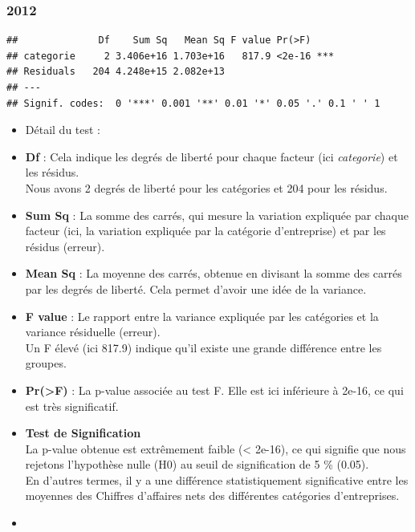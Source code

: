 \documentclass[mstat,12pt]{unswthesis}
\begin{document}
\medskip

\subsubsection{\texorpdfstring{\textbf{2012}}{2012}}\label{section}

\medskip

\begin{verbatim}
##              Df    Sum Sq   Mean Sq F value Pr(>F)    
## categorie     2 3.406e+16 1.703e+16   817.9 <2e-16 ***
## Residuals   204 4.248e+15 2.082e+13                   
## ---
## Signif. codes:  0 '***' 0.001 '**' 0.01 '*' 0.05 '.' 0.1 ' ' 1
\end{verbatim}

\begin{itemize}
\item
  Détail du test :
\item
  \textbf{Df} : Cela indique les degrés de liberté pour chaque facteur
  (ici \emph{categorie}) et les résidus.\\
  Nous avons 2 degrés de liberté pour les catégories et 204 pour les
  résidus.
\item
  \textbf{Sum Sq} : La somme des carrés, qui mesure la variation
  expliquée par chaque facteur (ici, la variation expliquée par la
  catégorie d'entreprise) et par les résidus (erreur).
\item
  \textbf{Mean Sq} : La moyenne des carrés, obtenue en divisant la somme
  des carrés par les degrés de liberté. Cela permet d'avoir une idée de
  la variance.
\item
  \textbf{F value} : Le rapport entre la variance expliquée par les
  catégories et la variance résiduelle (erreur).\\
  Un F élevé (ici 817.9) indique qu'il existe une grande différence
  entre les groupes.
\item
  \textbf{Pr(\textgreater F)} : La p-value associée au test F. Elle est
  ici inférieure à 2e-16, ce qui est très significatif.
\item
  \textbf{Test de Signification}\\
  La p-value obtenue est extrêmement faible (\textless{} 2e-16), ce qui
  signifie que nous rejetons l'hypothèse nulle (H0) au seuil de
  signification de 5 \% (0.05).\\
  En d'autres termes, il y a une différence statistiquement
  significative entre les moyennes des Chiffres d'affaires nets des
  différentes catégories d'entreprises.
\item

\end{itemize}
\end{document}
